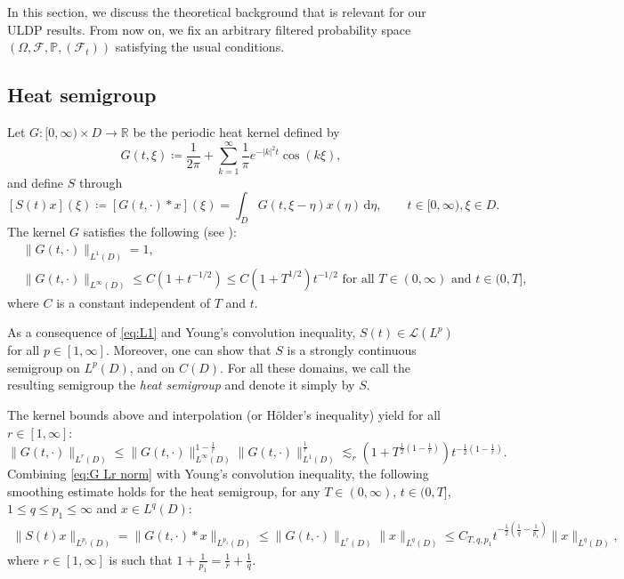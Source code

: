 \documentclass{amsart}
\theoremstyle{plain}
\theoremstyle{remark}
\theoremstyle{plain}
\numberwithin{equation}{section}
\newcommand{\R}{\mathbb{R}}
\newcommand{\ceqq}{\coloneqq}
\newcommand{\col}{\colon}
\renewcommand{\P}{{\mathbb P}}
\newcommand{\F}{{\mathscr F}}
\newcommand{\Om}{\Omega}
\newcommand{\calL}{\mathcal{L}}
\newcommand{\dd}{\,\mathrm{d}}
\begin{document}
In this section, we discuss the    theoretical background that is relevant for our ULDP results. From now on, we fix an arbitrary filtered probability space $(\Om,\F,\P,(\F_t))$ satisfying the usual conditions. 

\subsection{Heat semigroup}\label{sub:heatkernel}

Let $G\col[0,\infty)\times D\to \R$ be the periodic heat kernel defined by 
\[
G(t,\xi)\ceqq  \frac{1}{2\pi} + \sum_{k=1}^{\infty} {\frac{1}{\pi}} e^{-|k|^2 t} \cos(k\xi),
\]
and define $S$ through 
\[
[S(t)x](\xi) \ceqq [G(t,\cdot)*x](\xi)=\int_D G(t,\xi-\eta)x(\eta)\dd \eta, \qquad t\in[0,\infty), \xi\in D.
\]
The kernel $G$ satisfies the following (see \cite[Lem.\ 2.1]{Salins25SHE}):  
\begin{align} 
  &\|G(t,\cdot)\|_{L^1(D)}=1,\label{eq:L1}\\
  &\|G(t,\cdot)\|_{L^\infty(D)}\leq C(1+t^{-1/2})\leq C(1+T^{1/2})t^{-1/2} \text{ for all $T\in(0,\infty)$ and $t\in(0,T]$,} \label{eq:Linfty}
\end{align}where $C$ is a constant independent of $T$ and $t$. 

As a consequence of \eqref{eq:L1} and Young's convolution inequality, $S(t)\in \calL(L^p)$ for all $p\in [1,\infty]$. Moreover, one can show that $S$ is a strongly continuous semigroup on $L^p(D)$, and on $C(D)$. For all these domains, we call the resulting semigroup the \emph{heat semigroup} and denote it simply by $S$. 

The kernel bounds above and  interpolation (or H\"older's inequality) yield for all $r\in[1,\infty]$:
\begin{equation}\label{eq:G Lr norm}
    \|G(t,\cdot)\|_{L^r(D)}\leq \|G(t,\cdot)\|_{L^\infty(D)}^{1-\frac1r}\|G(t,\cdot)\|_{L^1(D)}^{\frac1r}
    \lesssim_r (1+T^{\frac12(1-\frac1r)})t^{-\frac12(1-\frac1r)}.
\end{equation}
Combining \eqref{eq:G Lr norm} with Young's convolution inequality, the following smoothing estimate holds for the heat semigroup, for any $T\in(0,\infty)$, $t\in(0,T]$, $1\leq q\leq p_1\leq \infty$ and $x\in L^q(D)$: 
\begin{align}
  \|S(t)x\|_{L^{p_1}(D)} =\|G(t,\cdot)*x\|_{L^{p_1}(D)}  
\leq \|G(t,\cdot)\|_{L^r(D)}\|x\|_{L^q(D)} 
\leq  C_{T,q,p_1} t^{-\frac12(\frac1q-\frac{1}{p_1})}\|x\|_{L^q(D)}, \label{eq:est}
\end{align}
where $r\in[1,\infty]$ is such that $1+\frac{1}{p_1}=\frac1r+\frac1q$.  
\end{document}
